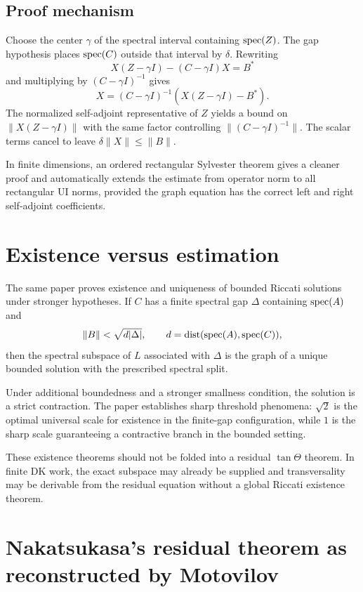 \subsection{Proof mechanism}

Choose the center $\gamma$ of the spectral interval containing $\operatorname{spec}(Z)$. The gap hypothesis places $\operatorname{spec}(C)$ outside that interval by $\delta$. Rewriting
\[
  X(Z-\gamma I)-(C-\gamma I)X=B^*
\]
and multiplying by $(C-\gamma I)^{-1}$ gives
\[
  X=(C-\gamma I)^{-1}(X(Z-\gamma I)-B^*).
\]
The normalized self-adjoint representative of $Z$ yields a bound on $\|X(Z-\gamma I)\|$ with the same factor controlling $\|(C-\gamma I)^{-1}\|$. The scalar terms cancel to leave $\delta\|X\|\le\|B\|$.

In finite dimensions, an ordered rectangular Sylvester theorem gives a cleaner proof and automatically extends the estimate from operator norm to all rectangular UI norms, provided the graph equation has the correct left and right self-adjoint coefficients.

\section{Existence versus estimation}

The same paper proves existence and uniqueness of bounded Riccati solutions under stronger hypotheses. If $C$ has a finite spectral gap $\Delta$ containing $\operatorname{spec}(A)$ and
\[
  \|B\|<\sqrt{d|\Delta|},
  \qquad
  d=\operatorname{dist}(\operatorname{spec}(A),\operatorname{spec}(C)),
\]
then the spectral subspace of $L$ associated with $\Delta$ is the graph of a unique bounded solution with the prescribed spectral split.

Under additional boundedness and a stronger smallness condition, the solution is a strict contraction. The paper establishes sharp threshold phenomena: $\sqrt2$ is the optimal universal scale for existence in the finite-gap configuration, while $1$ is the sharp scale guaranteeing a contractive branch in the bounded setting.

These existence theorems should not be folded into a residual $\tan\Theta$ theorem. In finite DK work, the exact subspace may already be supplied and transversality may be derivable from the residual equation without a global Riccati existence theorem.

\section{Nakatsukasa's residual theorem as reconstructed by Motovilov}

